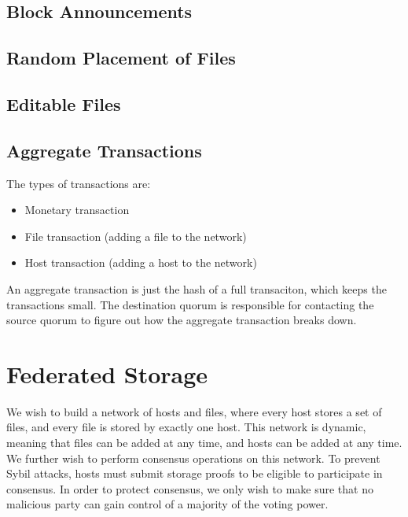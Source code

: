 \documentclass[twocolumn]{article}
\begin{document}
\subsection{Block Announcements}


\subsection{Random Placement of Files}

\subsection{Editable Files}

\subsection{Aggregate Transactions}
The types of transactions are:
\begin{itemize}
	\item Monetary transaction
	\item File transaction (adding a file to the network)
	\item Host transaction (adding a host to the network)
\end{itemize}

An aggregate transaction is just the hash of a full transaciton, which keeps the transactions small.
The destination quorum is responsible for contacting the source quorum to figure out how the aggregate transaction breaks down.

\section{Federated Storage}
We wish to build a network of hosts and files, where every host stores a set of files, and every file is stored by exactly one host.
This network is dynamic, meaning that files can be added at any time, and hosts can be added at any time.
We further wish to perform consensus operations on this network.
To prevent Sybil attacks, hosts must submit storage proofs to be eligible to participate in consensus.
In order to protect consensus, we only wish to make sure that no malicious party can gain control of a majority of the voting power.
\end{document}
